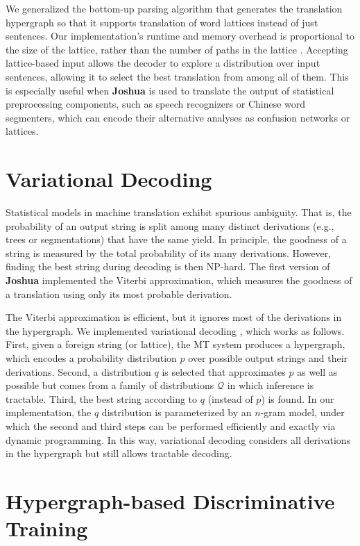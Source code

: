 \documentclass[11pt]{article}
\newcommand{\joshua}{\textbf{Joshua}\xspace}
\begin{document}
We generalized the bottom-up parsing algorithm that generates the translation
hypergraph so that it supports translation of word lattices instead of just
sentences.  Our implementation's runtime and memory overhead is proportional to
the size of the lattice, rather than the number of paths in the lattice
\cite{dyer-muresan-resnik:2008:ACLMain}.  Accepting lattice-based input allows
the decoder to explore a distribution over input sentences,  allowing it to
select the best translation from among all of them.  This is especially useful
when \joshua is used to translate the output of statistical preprocessing
components, such as speech recognizers or Chinese word segmenters, which can
encode their alternative analyses as confusion networks or lattices. 


\section{Variational Decoding}

Statistical models in machine translation exhibit spurious ambiguity.
That is, the probability of an output string is split
among many distinct derivations (e.g., trees or
segmentations) that have the same yield. In principle, the goodness of a
string is measured by the total probability of its
many derivations. However, finding the best string
during decoding is then NP-hard.
The first version of \joshua implemented the
Viterbi approximation, which measures the goodness 
of a translation using only its most probable derivation.

The Viterbi approximation is efficient, but it ignores most of the derivations in the hypergraph.
We implemented variational decoding \cite{variational-decoding-acl09}, which works as follows.
First, given a foreign string (or lattice), the MT system produces a hypergraph, 
which encodes a probability distribution $p$ over 
possible output strings and their derivations.
Second, a distribution $q$ is selected that approximates $p$ as well as possible but comes from a family of distributions $\mathcal{Q}$ in which inference is tractable.  Third, the best string according to $q$ (instead of $p$) is found.
In our implementation, the $q$ distribution is parameterized by an $n$-gram model, under which 
the second and third steps can be performed efficiently and exactly via dynamic programming.
In this way, variational decoding considers all derivations in the hypergraph but still
allows tractable decoding. 


\section{Hypergraph-based Discriminative Training}
\end{document}
